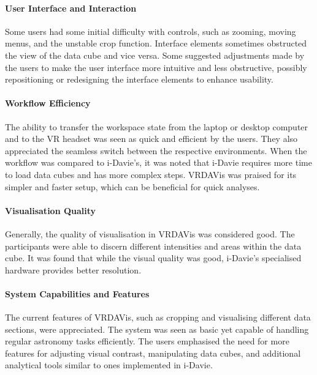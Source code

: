 \paragraph{User Interface and Interaction}
Some users had some initial difficulty with controls, such as zooming, moving menus, and the unstable crop function.
Interface elements sometimes obstructed the view of the data cube and vice versa.
Some suggested adjustments made by the users to make the user interface more intuitive and less obstructive, possibly repositioning or redesigning the interface elements to enhance usability.

\paragraph{Workflow Efficiency}
The ability to transfer the workspace state from the laptop or desktop computer and to the VR headset was seen as quick and efficient by the users.
They also appreciated the seamless switch between the respective environments.
When the workflow was compared to i-Davie's, it was noted that i-Davie requires more time to load data cubes and has more complex steps.
VRDAVis was praised for its simpler and faster setup, which can be beneficial for quick analyses.

\paragraph{Visualisation Quality}
Generally, the quality of visualisation in VRDAVis was considered good.
The participants were able to discern different intensities and areas within the data cube.
It was found that while the visual quality was good, i-Davie’s specialised hardware provides better resolution.

\paragraph{System Capabilities and Features}
The current features of VRDAVis, such as cropping and visualising different data sections, were appreciated.
The system was seen as basic yet capable of handling regular astronomy tasks efficiently.
The users emphasised the need for more features for adjusting visual contrast, manipulating data cubes, and additional analytical tools similar to ones implemented in i-Davie.

